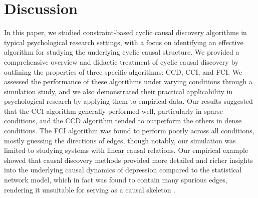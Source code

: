 \documentclass[twoside, 11pt]{article}
\begin{document}

\newpage
\section{Discussion}
In this paper, we studied constraint-based cyclic causal discovery algorithms in typical psychological research settings, with a focus on identifying an effective algorithm for studying the underlying cyclic causal structure. We provided a comprehensive overview and didactic treatment of cyclic causal discovery by outlining the properties of three specific algorithms: CCD, CCI, and FCI. 
We assessed the performance of these algorithms under varying conditions through a simulation study, and we also demonstrated their practical applicability in psychological research by applying them to empirical data. 
Our results suggested that the CCI algorithm generally performed well, particularly in sparse conditions, and the CCD algorithm tended to outperform the others in dense conditions. The FCI algorithm was found to perform poorly across all conditions, mostly guessing the directions of edges, though notably, our simulation was limited to studying systems with linear causal relations. Our empirical example showed that causal discovery methods provided more detailed and richer insights into the underlying causal dynamics of depression compared to the statistical network model, which in fact was found to contain many spurious edges, rendering it unsuitable for serving as a causal skeleton \citep{Ryan2022}. 
\end{document}
